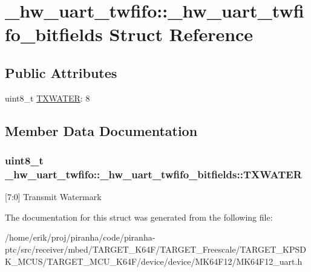 \hypertarget{struct__hw__uart__twfifo_1_1__hw__uart__twfifo__bitfields}{}\section{\+\_\+hw\+\_\+uart\+\_\+twfifo\+:\+:\+\_\+hw\+\_\+uart\+\_\+twfifo\+\_\+bitfields Struct Reference}
\label{struct__hw__uart__twfifo_1_1__hw__uart__twfifo__bitfields}
\subsection*{Public Attributes}
\begin{DoxyCompactItemize}
\item 
uint8\+\_\+t \hyperlink{struct__hw__uart__twfifo_1_1__hw__uart__twfifo__bitfields_aae35c625ffc1e77931373dfbe6f37cdb}{T\+X\+W\+A\+T\+ER}\+: 8
\end{DoxyCompactItemize}


\subsection{Member Data Documentation}
\subsubsection[{\texorpdfstring{T\+X\+W\+A\+T\+ER}{TXWATER}}]{\setlength{\rightskip}{0pt plus 5cm}uint8\+\_\+t \+\_\+hw\+\_\+uart\+\_\+twfifo\+::\+\_\+hw\+\_\+uart\+\_\+twfifo\+\_\+bitfields\+::\+T\+X\+W\+A\+T\+ER}\hypertarget{struct__hw__uart__twfifo_1_1__hw__uart__twfifo__bitfields_aae35c625ffc1e77931373dfbe6f37cdb}{}\label{struct__hw__uart__twfifo_1_1__hw__uart__twfifo__bitfields_aae35c625ffc1e77931373dfbe6f37cdb}
\mbox{[}7\+:0\mbox{]} Transmit Watermark 

The documentation for this struct was generated from the following file\+:\begin{DoxyCompactItemize}
\item 
/home/erik/proj/piranha/code/piranha-\/ptc/src/receiver/mbed/\+T\+A\+R\+G\+E\+T\+\_\+\+K64\+F/\+T\+A\+R\+G\+E\+T\+\_\+\+Freescale/\+T\+A\+R\+G\+E\+T\+\_\+\+K\+P\+S\+D\+K\+\_\+\+M\+C\+U\+S/\+T\+A\+R\+G\+E\+T\+\_\+\+M\+C\+U\+\_\+\+K64\+F/device/device/\+M\+K64\+F12/M\+K64\+F12\+\_\+uart.\+h\end{DoxyCompactItemize}
